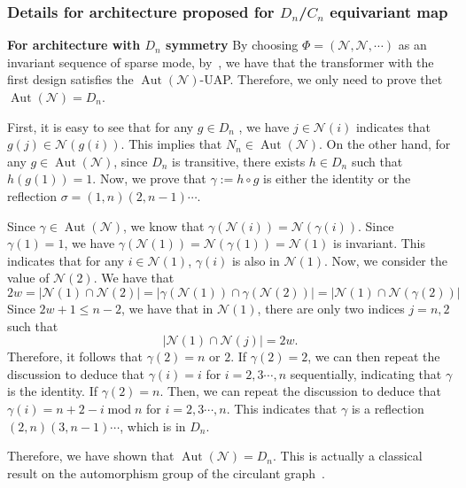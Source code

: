 \documentclass{article}
\begin{document}
\subsubsection{Details for architecture proposed for $D_n$/$C_n$ equivariant map}
\textbf{For architecture with $D_n$ symmetry}
By choosing $\Phi=(\mathcal N,\mathcal N,\cdots)$ as an invariant sequence of sparse mode, by~, we have that the transformer with the first design satisfies the $\operatorname{Aut}(\mathcal N)$-UAP. Therefore, we only need to prove thet $\operatorname{Aut}(\mathcal N)=D_n$. 

First, it is easy to see that for any $g\in D_n$ , we have $j\in \mathcal N(i)$ indicates that $g(j)\in \mathcal N(g(i))$. This implies that $N_n\in \operatorname{Aut}(\mathcal N)$. On the other hand, for any $g\in \operatorname{Aut}(\mathcal N)$, since $D_n$ is transitive, there exists $h\in D_n$ such that $h(g(1))=1$. Now, we prove that $\gamma:=h\circ g$ is either the identity or the reflection $\sigma=(1, n)(2, n-1)\cdots$.

Since $\gamma\in \operatorname{Aut}(\mathcal N)$, we know that $\gamma(\mathcal N(i))=\mathcal N(\gamma(i))$. Since $\gamma(1)=1$, we have $\gamma(\mathcal N(1))=\mathcal N(\gamma(1))=\mathcal N(1)$ is invariant. This indicates that for any $i\in\mathcal N(1)$, $\gamma(i)$ is also in $\mathcal N(1)$. Now, we consider the value of $\mathcal N(2)$. We have that 
\begin{equation}
    2w=|\mathcal N(1)\cap \mathcal N(2)|=|\gamma(\mathcal N(1))\cap \gamma(\mathcal N(2))|=|\mathcal N(1)\cap \mathcal N(\gamma(2))|
\end{equation}
Since $2w+1\le n-2$, we have that in $\mathcal N(1)$, there are only two indices $j=n,2$ such that 
\begin{equation}
    |\mathcal N(1)\cap \mathcal N(j)|=2w.
\end{equation}
Therefore, it follows that $\gamma(2)=n$ or $2$. If $\gamma(2)=2$, we can then repeat the discussion to deduce that $\gamma(i)=i$ for $i=2,3\cdots, n$ sequentially, indicating that $\gamma$ is the identity. 
If $\gamma(2)=n$. Then, we can repeat the discussion to deduce that $\gamma(i)=n+2-i \operatorname{mod} n$ for $i=2,3\cdots, n$. This indicates that $\gamma$ is a reflection $(2, n)(3,n-1)\cdots$, which is in $D_n$.

Therefore, we have shown that $\operatorname{Aut}(\mathcal N)=D_n$. This is actually a classical result on the automorphism group of the circulant  graph~\cite{biggs1993algebraic}.
\end{document}
